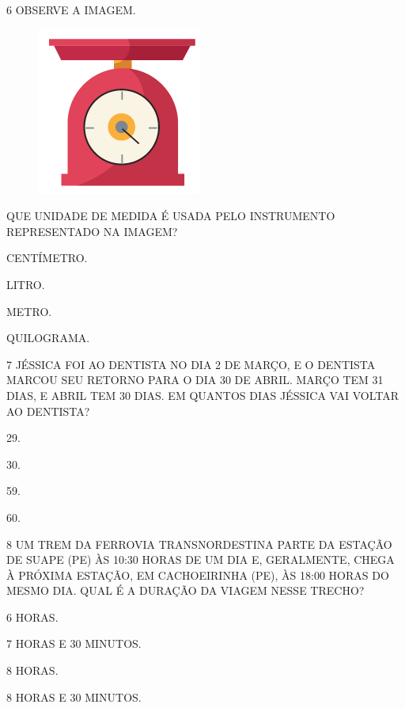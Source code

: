 \num{6} OBSERVE A IMAGEM.


\begin{figure}[H]
\centering
\includegraphics[width=.25\textwidth]{./media/SAEB_1ANO_MAT_FIGURA123.png}
\end{figure}

QUE UNIDADE DE MEDIDA É USADA PELO INSTRUMENTO REPRESENTADO NA IMAGEM?

\begin{escolha}[itemsep=0pt]
\item CENTÍMETRO.

\item LITRO.

\item METRO.

\item QUILOGRAMA.
\end{escolha}

\pagebreak
\num{7} JÉSSICA FOI AO DENTISTA NO DIA 2 DE MARÇO, E O DENTISTA MARCOU SEU
RETORNO PARA O DIA 30 DE ABRIL. MARÇO TEM 31 DIAS, E ABRIL TEM 30 DIAS. EM QUANTOS DIAS JÉSSICA VAI VOLTAR AO DENTISTA?

\begin{escolha}
\item 29.

\item 30.

\item 59.

\item 60.
\end{escolha}

\num{8} UM TREM DA FERROVIA TRANSNORDESTINA PARTE DA ESTAÇÃO DE SUAPE (PE) ÀS 10:30 
HORAS DE UM DIA E, GERALMENTE, CHEGA À PRÓXIMA ESTAÇÃO, EM CACHOEIRINHA (PE), ÀS 
18:00 HORAS DO MESMO DIA. QUAL É A DURAÇÃO DA VIAGEM NESSE TRECHO?

\begin{escolha}
\item 6 HORAS.

\item 7 HORAS E 30 MINUTOS.

\item 8 HORAS.

\item 8 HORAS E 30 MINUTOS.
\end{escolha}

